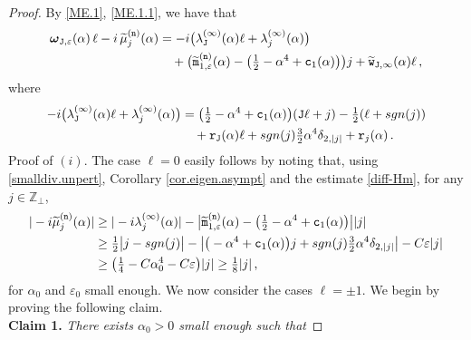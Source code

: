 \documentclass[10pt,a4paper]{amsart}
\newcommand{\Z}{{\mathbb Z}}
\newcommand{\bomega}{{\boldsymbol{\omega}}}
\newcommand{\im}{{\rm i}}
\newcommand{\tJ}{{\mathtt J}}
\newcommand{\tc}{{\mathtt c}}
\newcommand{\tm}{{\mathtt m}}
\newcommand{\tn}{{\mathtt n}}
\newcommand{\tr}{{\mathtt r}}
\newcommand{\tw}{{\mathtt w}}
\newcommand{\wt}[1]{{\widetilde{#1}}}
\begin{document}
\begin{proof}
    By \eqref{ME.1}, \eqref{ME.1.1}, we have that
    \begin{align}
        \bomega_{\tJ,\varepsilon}(\alpha)\,\ell  -\im\,\wt\mu_{j}^{(\tn)}(\alpha)  
        & = -\im \big( \lambda_{\tJ}^{(\infty)}(\alpha) \ell + \lambda_{j}^{(\infty)}(\alpha) \big)  \\
         & \quad + \big( \wt\tm_{1,\varepsilon}^{(\tn)}(\alpha) - \big( \tfrac12 -\alpha^4 + \tc_{1}(\alpha) \big)  \big)j + \wt\tw_{\tJ,\infty}(\alpha) \ell  \,,\label{smalldiv}
    \end{align}
    where
    \begin{align}
    	-\im \big( \lambda_{\tJ}^{(\infty)}(\alpha) \ell + \lambda_{j}^{(\infty)}(\alpha) \big)   & = \big( \tfrac12 - \alpha^4 +\tc_{1}(\alpha)  \big)(\tJ \ell +j) - \tfrac12(\ell +{\rm sgn}(j)) \\
    	&\quad+ \tr_{\tJ}(\alpha)\ell + {\rm sgn}(j)\tfrac32\alpha^4 \delta_{2,|j|} + \tr_{j}(\alpha)\,. \label{smalldiv.unpert}
    \end{align}
     {\sc Proof of $(i)$}. The case $\ell=0$ easily follows by noting that, using \eqref{smalldiv.unpert}, Corollary \ref{cor.eigen.asympt} and the estimate \eqref{diff-Hm}, for any $j\in \Z_{\perp}$,
      \begin{align}
         |-\im \wt\mu_{j}^{(\tn)}(\alpha)| & \geq |-\im \lambda_{j}^{(\infty)}(\alpha)|  -\big| \wt\tm_{1,\varepsilon}^{(\tn)}(\alpha) - \big( \tfrac12 -\alpha^4 + \tc_{1}(\alpha) \big)  \big| |j| \\
          & \geq \tfrac12 \big| j- {\rm sgn}(j) \big| - \big| \big(-\alpha^4 +\tc_{1}(\alpha) \big) j + {\rm sgn}(j) \tfrac32 \alpha^4 \delta_{2,|j|} \big| - C\varepsilon |j| \\
          & \geq \big( \tfrac14 - C \alpha_0^4 - C \varepsilon \big) |j| \geq \tfrac18 |j|\,,
      \end{align}
      for $\alpha_0$ and $\varepsilon_{0}$ small enough. We now consider the cases $\ell= \pm 1$. We begin by proving the following claim.
   \\[1mm]
   {\bf Claim 1.} {\it There exists $\alpha_{0}>0$ small enough such that}

\end{proof}
\end{document}

